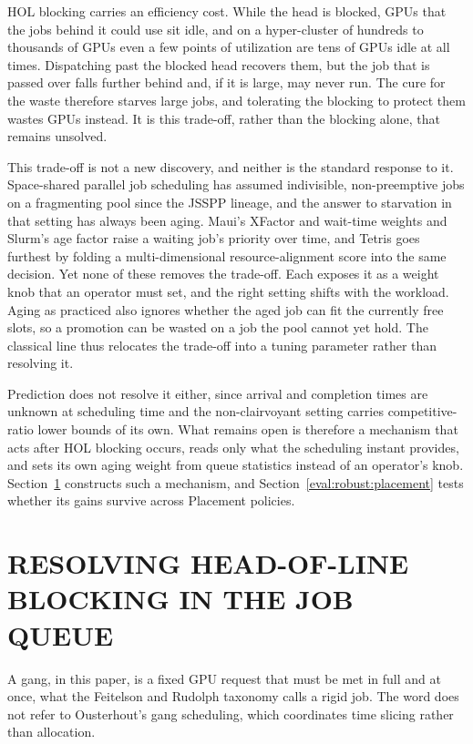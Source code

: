 \documentclass{ieeetj}
\begin{document}
HOL blocking carries an efficiency cost. While the head is blocked, GPUs that the jobs behind it could use sit idle, and on a hyper-cluster of hundreds to thousands of GPUs even a few points of utilization are tens of GPUs idle at all times. Dispatching past the blocked head recovers them, but the job that is passed over falls further behind and, if it is large, may never run. The cure for the waste therefore starves large jobs, and tolerating the blocking to protect them wastes GPUs instead. It is this trade-off, rather than the blocking alone, that remains unsolved.

This trade-off is not a new discovery, and neither is the standard response to it. Space-shared parallel job scheduling has assumed indivisible, non-preemptive jobs on a fragmenting pool since the JSSPP lineage\cite{feitelson1996toward}, and the answer to starvation in that setting has always been aging. Maui's XFactor and wait-time weights\cite{jackson2001maui} and Slurm's age factor raise a waiting job's priority over time, and Tetris\cite{grandl2014multi} goes furthest by folding a multi-dimensional resource-alignment score into the same decision. Yet none of these removes the trade-off. Each exposes it as a weight knob that an operator must set, and the right setting shifts with the workload. Aging as practiced also ignores whether the aged job can fit the currently free slots, so a promotion can be wasted on a job the pool cannot yet hold. The classical line thus relocates the trade-off into a tuning parameter rather than resolving it.

Prediction does not resolve it either, since arrival and completion times are unknown at scheduling time and the non-clairvoyant setting carries competitive-ratio lower bounds of its own\cite{motwani1994nonclairvoyant}. What remains open is therefore a mechanism that acts after HOL blocking occurs, reads only what the scheduling instant provides, and sets its own aging weight from queue statistics instead of an operator's knob. Section~\ref{algo:intro} constructs such a mechanism, and Section~\ref{eval:robust:placement} tests whether its gains survive across Placement policies.

\section{RESOLVING HEAD-OF-LINE BLOCKING IN THE JOB QUEUE}\label{algo:intro}
A gang, in this paper, is a fixed GPU request that must be met in full and at once, what the Feitelson and Rudolph taxonomy\cite{feitelson1996toward} calls a rigid job. The word does not refer to Ousterhout's gang scheduling\cite{ousterhout1982gang}, which coordinates time slicing rather than allocation.
\end{document}
